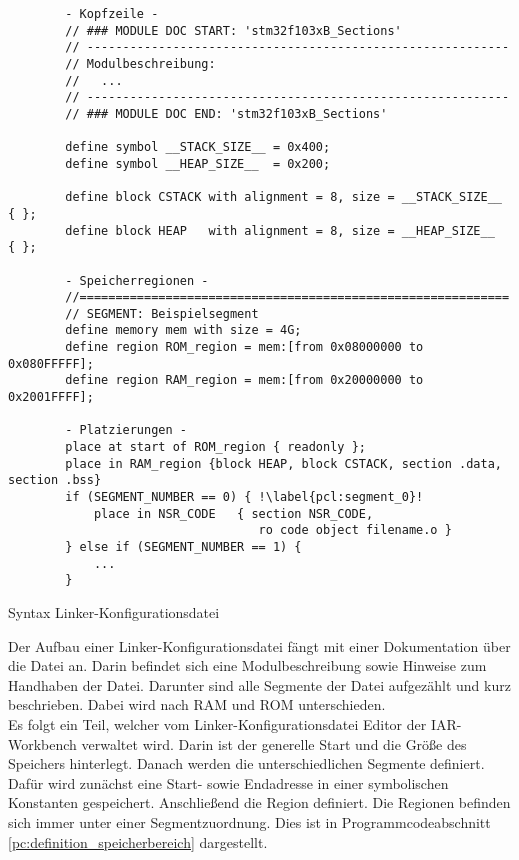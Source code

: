 \begin{listing}[H]
	\begin{verbatim}
		- Kopfzeile -
		// ### MODULE DOC START: 'stm32f103xB_Sections'
		// -----------------------------------------------------------
		// Modulbeschreibung:
		// 	 ...
		// -----------------------------------------------------------
		// ### MODULE DOC END: 'stm32f103xB_Sections'
		
		define symbol __STACK_SIZE__ = 0x400;
		define symbol __HEAP_SIZE__  = 0x200;
		
		define block CSTACK with alignment = 8, size = __STACK_SIZE__  { };
		define block HEAP   with alignment = 8, size = __HEAP_SIZE__   { };
		
		- Speicherregionen -
		//============================================================
		// SEGMENT: Beispielsegment
		define memory mem with size = 4G;
		define region ROM_region = mem:[from 0x08000000 to 0x080FFFFF];
		define region RAM_region = mem:[from 0x20000000 to 0x2001FFFF];
		
		- Platzierungen -
		place at start of ROM_region { readonly };
		place in RAM_region {block HEAP, block CSTACK, section .data, section .bss}
		if (SEGMENT_NUMBER == 0) { !\label{pcl:segment_0}!
			place in NSR_CODE	{ section NSR_CODE,
								   ro code object filename.o } 
		} else if (SEGMENT_NUMBER == 1) {
			...
		}
	\end{verbatim}
	\caption{Syntax Linker-Konfigurationsdatei}
	\label{pc:syntax_linker}
\end{listing}

Der Aufbau einer Linker-Konfigurationsdatei fängt mit einer Dokumentation über die Datei an.
Darin befindet sich eine Modulbeschreibung sowie Hinweise zum Handhaben der Datei.
Darunter sind alle Segmente der Datei aufgezählt und kurz beschrieben.
Dabei wird nach \ac{RAM} und \ac{ROM} unterschieden. \\

Es folgt ein Teil, welcher vom Linker-Konfigurationsdatei Editor der IAR-Workbench verwaltet wird.
Darin ist der generelle Start und die Größe des Speichers hinterlegt.
Danach werden die unterschiedlichen Segmente definiert.
Dafür wird zunächst eine Start- sowie Endadresse in einer symbolischen Konstanten gespeichert.
Anschließend die Region definiert.
Die Regionen befinden sich immer unter einer Segmentzuordnung.
Dies ist in Programmcodeabschnitt \ref{pc:definition_speicherbereich} dargestellt. \\

